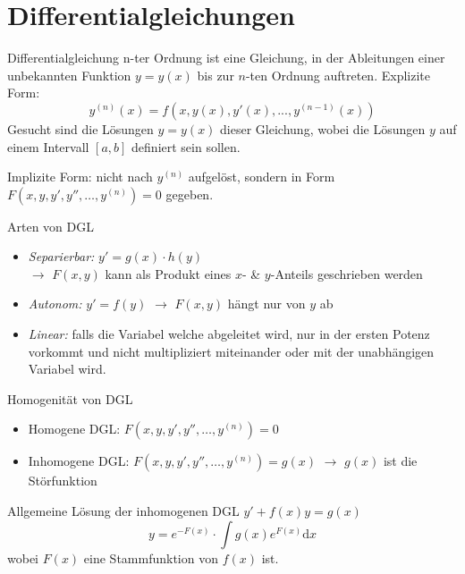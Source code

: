 \section{Differentialgleichungen}

\begin{definition}{Differentialgleichung n-ter Ordnung} 
ist eine Gleichung, in der Ableitungen einer unbekannten Funktion $y = y(x)$ bis zur $n$-ten Ordnung auftreten. Explizite Form:
\vspace{-2mm}\\
$$y^{(n)}(x) = f(x, y(x), y'(x), ..., y^{(n-1)}(x))$$
Gesucht sind die Lösungen $y = y(x)$ dieser Gleichung, wobei die Lösungen $y$ auf einem Intervall $[a,b]$ definiert sein sollen.

Implizite Form: nicht nach $y^{(n)}$ aufgelöst, sondern in Form \\ $F(x,y,y',y'',\ldots,y^{(n)})=0$ gegeben.
\end{definition}

\begin{concept}{Arten von DGL}
  \begin{itemize}
    \item \emph{Separierbar:} $y'=g(x)\cdot h(y)$\\
    $\rightarrow$ \(F(x,y)\) kann als Produkt eines \(x\)- \& \(y\)-Anteils geschrieben werden
      
    \item \emph{Autonom:} $y'=f(y)$ 
    $\rightarrow$ \(F(x,y)\) hängt nur von \(y\) ab
      
    \item \emph{Linear:} falls die Variabel welche abgeleitet wird, nur in der ersten Potenz vorkommt und nicht
      multipliziert miteinander oder mit der unabhängigen Variabel wird.
  \end{itemize}
\end{concept}

\begin{theorem}{Homogenität von DGL}
  \begin{itemize}
    \item Homogene DGL: \(F(x,y,y',y'',\ldots,y^{(n)})=0\)
    \item Inhomogene DGL: \(F(x,y,y',y'',\ldots,y^{(n)})=g(x)\)
    $\rightarrow$ \(g(x)\) ist die Störfunktion
  \end{itemize}
\end{theorem}

\begin{corollary}{Allgemeine Lösung der inhomogenen DGL}
  $y'+f(x)y=g(x)$
  \vspace{-3mm}\\
      \[y=e^{-F(x)}\cdot \int{g(x)e^{F(x)}\mathrm{d}x}\]
      \small
      wobei \(F(x)\) eine Stammfunktion von \(f(x)\) ist.
\end{corollary}




